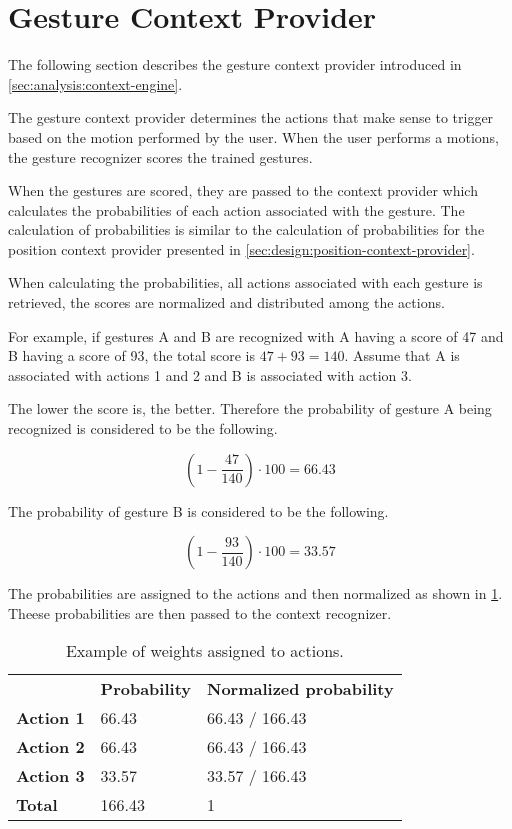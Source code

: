 \section{Gesture Context Provider}
\label{sec:design:gesture-context-provider}

The following section describes the gesture context provider introduced in \cref{sec:analysis:context-engine}.

The gesture context provider determines the actions that make sense to trigger based on the motion performed by the user. When the user performs a motions, the gesture recognizer scores the trained gestures.

When the gestures are scored, they are passed to the context provider which calculates the probabilities of each action associated with the gesture. The calculation of probabilities is similar to the calculation of probabilities for the position context provider presented in \cref{sec:design:position-context-provider}.

When calculating the probabilities, all actions associated with each gesture is retrieved, the scores are normalized and distributed among the actions.

For example, if gestures A and B are recognized with A having a score of 47 and B having a score of 93, the total score is $47 + 93 = 140$. Assume that A is associated with actions 1 and 2 and B is associated with action 3.

The lower the score is, the better. Therefore the probability of gesture A being recognized is considered to be the following.

\begin{equation*}
(1 - \frac{47}{140}) \cdot 100 = 66.43
\end{equation*}

The probability of gesture B is considered to be the following.

\begin{equation*}
(1 - \frac{93}{140}) \cdot 100 = 33.57
\end{equation*}

The probabilities are assigned to the actions and then normalized as shown in \cref{tbl:sec:design:gesture-context-provider:weighted-actions}. Theese probabilities are then passed to the context recognizer.

\begin{table}[h!]
\centering
\caption{Example of weights assigned to actions.}
\label{tbl:sec:design:gesture-context-provider:weighted-actions}
\begin{tabular}{lll}
                  & \textbf{Probability} & \textbf{Normalized probability} \\
\textbf{Action 1} & 66.43           & 66.43 / 166.43             \\
\textbf{Action 2} & 66.43           & 66.43 / 166.43             \\
\textbf{Action 3} & 33.57           & 33.57 / 166.43             \\
\textbf{Total}    & 166.43          & 1                         
\end{tabular}
\end{table}

